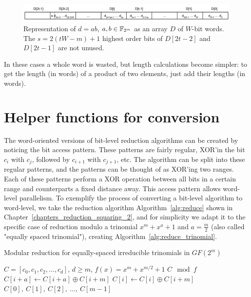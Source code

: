 \begin{figure}
  \centering
  \includegraphics[width = \columnwidth]{figures/two-word-element-2.pdf}
\caption{Representation of $d = ab$, $a,b \in {\mathbb F}_{2^m}$ as an array $D$ of $W$-bit words. The $s = 2(tW-m)+1$ highest order bits of $D[2t-2]$ and $D[2t-1]$ are not unused.}
\label{fig:elemento:field:mult2}
\end{figure}

In these cases a whole word is wasted, but length calculations become simpler: to get the length (in words) of a product of two elements, just add their lengths (in words). \\


\section{Helper functions for conversion} \label{helper-functions}

The word-oriented versions of bit-level reduction algorithms can be created by noticing the bit access pattern. These patterns are fairly regular, XOR'in the bit $c_i$ with $c_j$, followed by $c_{i+1}$ with $c_{j+1}$, etc. The algorithm can be split into these regular patterns, and the patterns can be thought of as XOR'ing two ranges. \\

Each of these patterns perform a XOR operation between all bits in a certain range and counterparts a fixed distance away. This access pattern allows word-level parallelism. To exemplify the process of converting a bit-level algorithm to word-level, we take the reduction algorithm Algorithm~\ref{alg:reduce} shown in Chapter~\ref{chapters_reduction_squaring_2}, and for simplicity we adapt it to the specific case of reduction modulo a trinomial $x^m + x^a + 1$ and $a=\frac{m}{2}$ (also called "equally spaced trinomial"), creating Algorithm~\ref{alg:reduce_trinomial}.

\begin{algorithm}
\caption{Modular reduction for equally-spaced irreducible trinomials in $GF(2^m)$}
\label{alg:reduce_trinomial}
\begin{algorithmic}[1]
\REQUIRE $C = [c_0, c_1, c_2, ..., c_d]$, $d \geq m$, $f(x) = x^m + x^{m/2} + 1$
\ENSURE $C \mod f$
    \STATE $C[i+a] \leftarrow C[i+a] \oplus C[i+m]$
  \ENDFOR
    \STATE $C[i] \leftarrow C[i] \oplus C[i+m]$
  \ENDFOR
\RETURN $C[0],~C[1],~C[2],~\ldots,~C[m-1]$
\end{algorithmic}
\end{algorithm}


